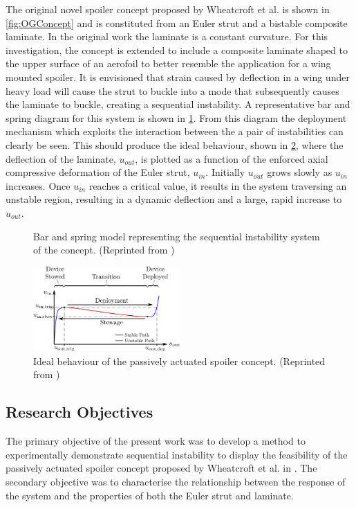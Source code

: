 \documentclass{IEEEtran}
\begin{document}
		The original novel spoiler concept proposed by Wheatcroft et al. is shown in \cref{fig:OGConcept} and is constituted from an Euler strut and a bistable composite laminate. In the original work the laminate is a constant curvature. For this investigation, the concept is extended to include a composite laminate shaped to the upper surface of an aerofoil to better resemble the application for a wing mounted spoiler. It is envisioned that strain caused by deflection in a wing under heavy load will cause the strut to buckle into a mode that subsequently causes the laminate to buckle, creating a sequential instability. A representative bar and spring diagram for this system is shown in \cref{fig:BarNSpring}. From this diagram the deployment mechanism which exploits the  interaction between the a pair of instabilities can clearly be seen. This should produce the ideal behaviour, shown in \cref{fig:DesiredPath}, where the deflection of the laminate, $u_{out}$, is plotted as a function of the enforced axial compressive deformation of the Euler strut, $u_{in}$. Initially $u_{out}$ grows slowly as $u_{in}$ increases. Once $u_{in}$  reaches a critical value, it results in the system traversing an unstable region, resulting in a dynamic deflection and a large, rapid increase to $u_{out}$.

		\begin{figure}[!h]
			\centering
			
			\caption{\centering Bar and spring model representing the sequential instability system of the concept. (Reprinted from \cite{Wheatcroft_2023})}
			\label{fig:BarNSpring}
		\end{figure}
	
		\begin{figure}[!h]
			\centering
			\includegraphics[width=0.5\textwidth]{IntroductionImages/Desired_Path_V4.png}
			\caption{\centering Ideal behaviour of the passively actuated spoiler concept. (Reprinted from \cite{Wheatcroft_2023})}
			\label{fig:DesiredPath}
		\end{figure}
       
	  \subsection{Research Objectives}
        The primary objective of the present work was to develop a method to experimentally demonstrate sequential instability to display the feasibility of the passively actuated spoiler concept proposed by Wheatcroft et al. in \cite{Wheatcroft_2023}. The secondary objective was to characterise the relationship between the response of the system and the properties of both the Euler strut and laminate. 
   
\end{document}
